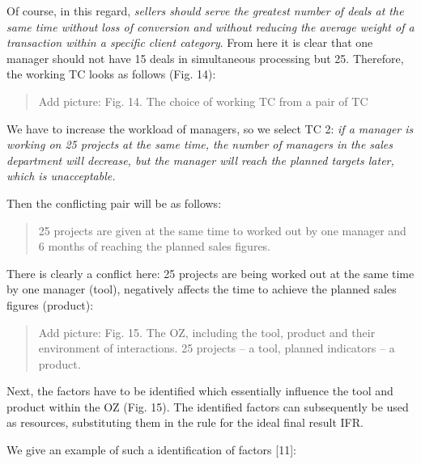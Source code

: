 \documentclass[11pt,a4paper]{book}
\newcommand{\addpicture}[1]{
  \begin{quote} Add picture: #1\end{quote}
}
\begin{document}
Of course, in this regard, \emph{sellers should serve the greatest number of
  deals at the same time without loss of conversion and without reducing the
  average weight of a transaction within a specific client category}. From
here it is clear that one manager should not have 15 deals in simultaneous
processing but 25. Therefore, the working TC looks as follows (Fig. 14):

\addpicture{Fig. 14. The choice of working TC from a pair of TC}

We have to increase the workload of managers, so we select TC 2: \emph{if a
  manager is working on 25 projects at the same time, the number of managers
  in the sales department will decrease, but the manager will reach the
  planned targets later, which is unacceptable.}

Then the conflicting pair will be as follows:
\begin{quote}
  25 projects are given at the same time to worked out by one manager and 6
  months of reaching the planned sales figures.
\end{quote}
There is clearly a conflict here: 25 projects are being worked out at the same
time by one manager (tool), negatively affects the time to achieve the planned
sales figures (product):

\addpicture{Fig. 15. The OZ, including the tool, product and their environment
  of interactions. 25 projects -- a tool, planned indicators -- a product.}

Next, the factors have to be identified which essentially influence the tool
and product within the OZ (Fig. 15). The identified factors can subsequently
be used as resources, substituting them in the rule for the ideal final result
IFR.

We give an example of such a identification of factors [11]:
\end{document}
